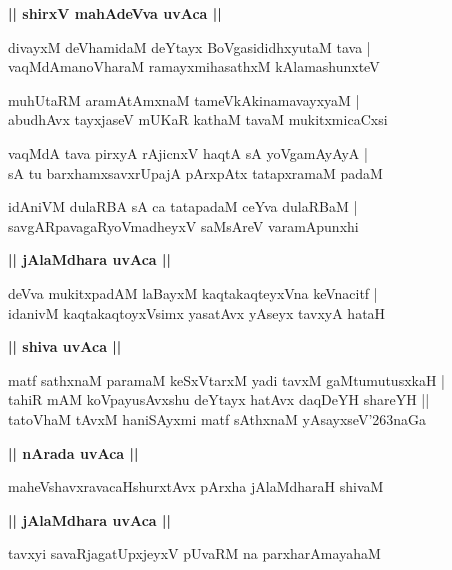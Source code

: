 \documentclass[twoside,12pt,openright]{book}
\def\S{\char'263}
\newcounter{shloka}[chapter]
\def\uvaca#1{\centerline{{\large\textbf{#1}}}}
\begin{document}
\uvaca{|| shirxV mahAdeVva uvAca ||}

\begin{shloka}%
divayxM deVhamidaM deYtayx BoVgasididhxyutaM tava |\\
vaqMdAmanoVharaM ramayxmihasathxM kAlamashunxteV 
\end{shloka}

\begin{shloka}%
muhUtaRM aramAtAmxnaM tameVkAkinamavayxyaM |\\
abudhAvx tayxjaseV mUKaR kathaM tavaM mukitxmicaCxsi 
\end{shloka}

\begin{shloka}%
vaqMdA tava pirxyA rAjicnxV haqtA sA yoVgamAyAyA |\\
sA tu barxhamxsavxrUpajA pArxpAtx tatapxramaM padaM 
\end{shloka}

\begin{shloka}%
idAniVM dulaRBA sA ca tatapadaM ceYva dulaRBaM |\\
savgARpavagaRyoVmadheyxV saMsAreV varamApunxhi
\end{shloka}

\uvaca{|| jAlaMdhara uvAca ||}

\begin{shloka}%
deVva mukitxpadAM laBayxM kaqtakaqteyxVna keVnacitf |\\
idanivM kaqtakaqtoyxVsimx yasatAvx yAseyx tavxyA hataH 
\end{shloka}

\uvaca{|| shiva uvAca ||}

\begin{shloka}%
matf sathxnaM paramaM keSxVtarxM yadi tavxM gaMtumutusxkaH |\\
tahiR mAM koVpayusAvxshu deYtayx hatAvx daqDeYH shareYH ||\\
tatoVhaM tAvxM haniSAyxmi matf sAthxnaM yAsayxseV\S naGa 
\end{shloka}

\uvaca{|| nArada uvAca ||}

\begin{shloka}%
maheVshavxravacaHshurxtAvx pArxha jAlaMdharaH shivaM 
\end{shloka}

\uvaca{|| jAlaMdhara uvAca ||}

\begin{shloka}%
tavxyi savaRjagatUpxjeyxV pUvaRM na parxharAmayahaM 
\end{shloka}
\end{document}

